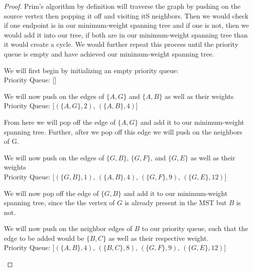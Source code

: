 \documentclass[11pt]{article}
\theoremstyle{definition}
\theoremstyle{definition}
\theoremstyle{definition}
\begin{document}
\begin{proof}
Prim's algorithm by definition will traverse the graph by pushing on the source vertex then popping it off and visiting itS neighbors. Then we would check if one endpoint is in our minimum-weight spanning tree and if one is not, then we would add it into our tree, if both are in our minimum-weight spanning tree than it would create a cycle. We would further repeat this process until the priority queue is empty and have achieved our minimum-weight spanning tree. \\

\begin{center}
We will first begin by initializing an empty priority queue: \\
Priority Queue: [] \\
\end{center}

\begin{center}
We will now push on the edges of $\{A, G\}$ and $\{A, B\}$ as well as their weights\\
Priority Queue: [$(\{A, G\},2)$, $(\{A, B\},4)$] \\
\end{center}

\begin{center}
From here we will pop off the edge of $\{A, G\}$ and add it to our minimum-weight spanning tree. Further, after we pop off this edge we will push on the neighbors of G.\\
\end{center}

\begin{center}
We will now push on the edges of $\{G, B\}$, $\{G, F\}$, and $\{G, E\}$ as well as their weights\\
Priority Queue: [$(\{G, B\},1)$, $(\{A, B\},4)$, $(\{G, F\},9)$, $(\{G, E\},12)$] \\
\end{center}

\begin{center}
We will now pop off the edge of $\{G, B\}$ and add it to our minimum-weight spanning tree, since the the vertex of $G$ is already present in the MST but $B$ is not.
\end{center}

\begin{center}
We will now push on the neighbor edges of $B$ to our priority queue, such that the edge to be added would be $\{B, C\}$ as well as their respective weight. \\
Priority Queue: [$(\{A, B\},4)$, $(\{B, C\},8)$, $(\{G, F\},9)$, $(\{G, E\},12)$] \\
\end{center}


\end{proof}
\end{document}
